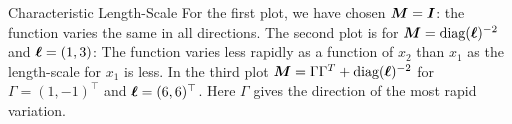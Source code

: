 \begin{frame}[c,allowframebreaks]{Characteristic Length-Scale}
\vspace{3mm}
For the first plot, we have chosen $\bm{M} = \boldsymbol{I}$: the function varies the same in all directions. The second plot is for $\bm{M} = \text{diag}(\bm{\ell})^{-2}$ and $\bm{\ell} = \left(1, 3 \right)$: The function varies less rapidly as a function of $x_2$ than $x_1$ as the length-scale for $x_1$ is less. In the third plot $\bm{M} = \Gamma \Gamma^T + \text{diag}(\bm{\ell})^{-2}$ for $\Gamma = (1, -1)^\top$ and $\bm{\ell} = (6, 6)^\top$. Here $\Gamma$ gives the direction of the most rapid variation. 


\end{frame}


